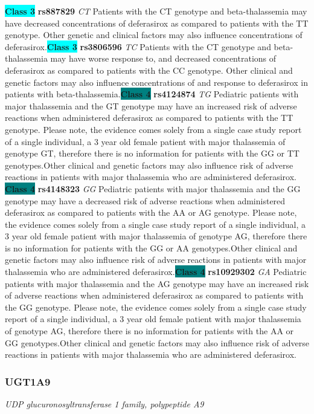 \documentclass{report}
\begin{document}
\textbf{\colorbox{cyan} {Class 3}} \textbf{ rs887829 } \textit{ CT }
Patients with the CT genotype and beta-thalassemia may have decreased concentrations of deferasirox as compared to patients with the TT genotype. Other genetic and clinical factors may also influence concentrations of deferasirox.\newline\textbf{\colorbox{cyan} {Class 3}} \textbf{ rs3806596 } \textit{ TC }
Patients with the CT genotype and beta-thalassemia may have worse response to, and decreased concentrations of deferasirox as compared to patients with the CC genotype. Other clinical and genetic factors may also influence concentrations of and response to deferasirox in patients with beta-thalassemia.\newline\textbf{\colorbox{teal} {Class 4}} \textbf{ rs4124874 } \textit{ TG }
Pediatric patients with major thalassemia and the GT genotype may have an increased risk of adverse reactions when administered deferasirox as compared to patients with the TT genotype. Please note, the evidence comes solely from a single case study report of a single individual, a 3 year old female patient with major thalassemia of genotype GT, therefore there is no information for patients with the GG or TT genotypes.Other clinical and genetic factors may also influence risk of adverse reactions in patients with major thalassemia who are administered deferasirox. \newline\textbf{\colorbox{teal} {Class 4}} \textbf{ rs4148323 } \textit{ GG }
Pediatric patients with major thalassemia and the GG genotype may have a decreased risk of adverse reactions when administered deferasirox as compared to patients with the AA or AG genotype. Please note, the evidence comes solely from a single case study report of a single individual, a 3 year old female patient with major thalassemia of genotype AG, therefore there is no information for patients with the GG or AA genotypes.Other clinical and genetic factors may also influence risk of adverse reactions in patients with major thalassemia who are administered deferasirox.\newline\textbf{\colorbox{teal} {Class 4}} \textbf{ rs10929302 } \textit{ GA }
Pediatric patients with major thalassemia and the AG genotype may have an increased risk of adverse reactions when administered deferasirox as compared to patients with the GG genotype. Please note, the evidence comes solely from a single case study report of a single individual, a 3 year old female patient with major thalassemia of genotype AG, therefore there is no information for patients with the AA or GG genotypes.Other clinical and genetic factors may also influence risk of adverse reactions in patients with major thalassemia who are administered deferasirox.\newline\subsubsection{ UGT1A9 }
\textit{ UDP glucuronosyltransferase 1 family, polypeptide A9 }
\end{document}
